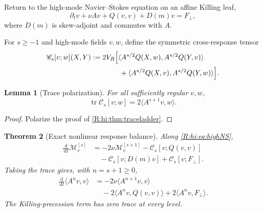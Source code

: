 \documentclass[
 aps,
 prd,
 reprint,
 amsmath,
 amssymb,
 nofootinbib,
 superscriptaddress
]{revtex4-2}
\newtheorem{theorem}{Theorem}[section]
\newtheorem{lemma}[theorem]{Lemma}
\theoremstyle{definition}
\theoremstyle{remark}
\newcommand{\cM}{\mathscr M}
\newcommand{\cC}{\mathscr C}
\newcommand{\dd}{\,\mathrm d}
\newcommand{\tr}{\operatorname{tr}}
\begin{document}
Return to the high-mode Navier--Stokes equation on an affine Killing leaf,
\begin{equation}
 \partial_tv
 +
 \nu Av
 +
 Q(v,v)
 +
 D(m)v
 =
 F_\perp,
 \label{R:hi:eq:highNS}
\end{equation}
where $D(m)$ is skew-adjoint and commutes with $A$.

For $s\ge-1$ and high-mode fields $v,w$, define the symmetric cross-response
tensor
\begin{align}
 \cC_s[v;w](X,Y)
 &:=
 2V_R
 \Bigl[
 \langle
 A^{s/2}Q(X,w),
 A^{s/2}Q(Y,v)
 \rangle
 \notag\\
 &\qquad\qquad+
 \langle
 A^{s/2}Q(X,v),
 A^{s/2}Q(Y,w)
 \rangle
 \Bigr].
 \label{R:hi:eq:Cs}
\end{align}

\begin{lemma}[Trace polarization]
\label{R:hi:lem:tracepolarization}
For all sufficiently regular $v,w$,
\begin{equation}
 \boxed{
 \tr\cC_s[v;w]
 =
 2\langle A^{s+1}v,w\rangle.
 }
 \label{R:hi:eq:tracepolarization}
\end{equation}
\end{lemma}

\begin{proof}
Polarize the proof of \cref{R:hi:thm:traceladder}.
\end{proof}

\begin{theorem}[Exact nonlinear response balance]
\label{R:hi:thm:nonlinearbalance}
Along \eqref{R:hi:eq:highNS},
\begin{equation}
\begin{aligned}
 \frac{\dd}{\dd t}\cM_v^{[s]}
 &=
 -2\nu\cM_v^{[s+1]}
 -
 \cC_s[v;Q(v,v)]\\
 &\quad-
 \cC_s[v;D(m)v]
 +
 \cC_s[v;F_\perp].
\end{aligned}
\label{R:hi:eq:tensorbalance}
\end{equation}
Taking the trace gives, with $n=s+1\ge0$,
\begin{equation}
\begin{aligned}
 \frac{\dd}{\dd t}\langle A^n v,v\rangle
 &=
 -2\nu\langle A^{n+1}v,v\rangle\\
 &\quad-
 2\langle A^n v,Q(v,v)\rangle
 +
 2\langle A^n v,F_\perp\rangle.
\end{aligned}
\label{R:hi:eq:momentbalance}
\end{equation}
The Killing-precession term has zero trace at every level.
\end{theorem}
\end{document}
